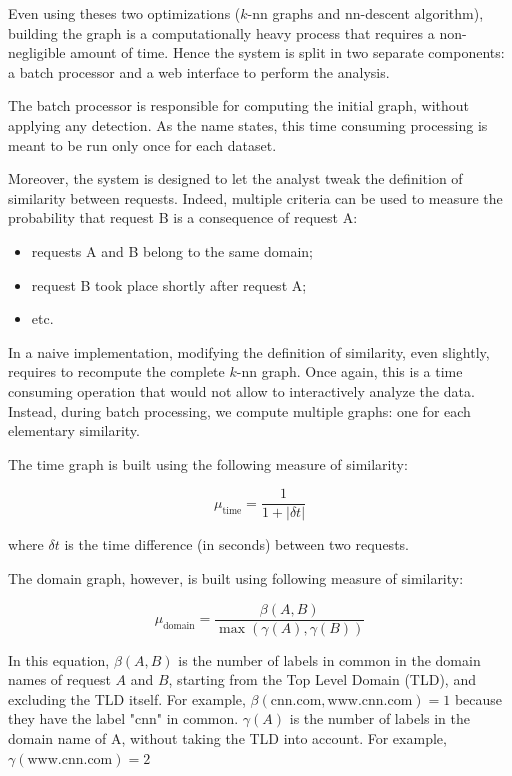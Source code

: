 \documentclass[conference]{IEEEtran}
\begin{document}
Even using theses two optimizations ($k$-nn graphs and nn-descent algorithm), building the graph is a computationally heavy process that requires a non-negligible amount of time. Hence the system is split in two separate components: a batch processor and a web interface to perform the analysis.

The batch processor is responsible for computing the initial graph, without applying any detection. As the name states, this time consuming processing is meant to be run only once for each dataset.

Moreover, the system is designed to let the analyst tweak the definition of similarity between requests. Indeed, multiple criteria can be used to measure the probability that request B is a consequence of request A:

\begin{itemize}
\item requests A and B belong to the same domain;
\item request B took place shortly after request A;
\item etc.
\end{itemize}

In a naive implementation, modifying the definition of similarity, even slightly, requires to recompute the complete $k$-nn graph. Once again, this is a time consuming operation that would not allow to interactively analyze the data. Instead, during batch processing, we compute multiple graphs: one for each elementary similarity.

The time graph is built using the following measure of similarity:

$$ \mu_{\text{time}} = \frac{1}{1+ |{\delta t}|}$$

where $\delta t$ is the time difference (in seconds) between two requests.

The domain graph, however, is built using following measure of similarity:

$$\mu_{\text{domain}} = \frac{\beta(A,B)}{\max(\gamma(A), \gamma(B))}$$

In this equation, $\beta(A,B)$ is the number of labels in common in the domain names of request $A$ and $B$, starting from the Top Level Domain (TLD), and excluding the TLD itself. For example, $\beta(\text{cnn.com}, \text{www.cnn.com}) = 1$ because they have the label "cnn" in common. $\gamma(A)$ is the number of labels in the domain name of A, without taking the TLD into account. For example, $\gamma(\text{www.cnn.com}) = 2$
\end{document}
